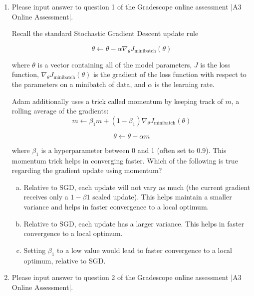 \begin{enumerate}[1.]
\item {} 
Please input answer to question 1 of the Gradescope online assessment |A3 Online Assessment|.

Recall the standard Stochastic Gradient Descent update rule

\begin{equation*}
        \theta \gets \theta - \alpha \nabla_{\theta} J_{\text{minibatch}}(\theta)
\end{equation*}

where $\theta$ is a vector containing all of the model parameters, $J$ is the loss function, $\nabla_{\theta} J_{\text{minibatch}}(\theta)$ is the gradient of the loss function with respect to the parameters on a minibatch of data, and $\alpha$ is the learning rate.

Adam additionally uses a trick called momentum by keeping track of $m$, a rolling average of the gradients:
\begin{equation*}
    m \gets \beta_1m + (1 - \beta_1)\nabla_{\theta} J_{\text{minibatch}}(\theta)
\end{equation*}
        
\begin{equation*}
    \theta \gets \theta - \alpha m
\end{equation*}

where $\beta_1$ is a hyperparameter between 0 and 1 (often set to 0.9). This momentum trick helps in converging faster. Which of the following is true regarding the gradient update using momentum?

\begin{enumerate}[(a)]
\item Relative to SGD, each update will not vary as much (the current gradient receives only a $1 - \beta1$ scaled update). This helps maintain a smaller variance and helps in faster convergence to a local optimum.
\item Relative to SGD, each update has a larger variance. This helps in faster convergence to a local optimum.
\item Setting $\beta_1$ to a low value would lead to faster convergence to a local optimum, relative to SGD.
\end{enumerate}


\item {} Please input answer to question 2 of the Gradescope online assessment |A3 Online Assessment|.


\end{enumerate}
